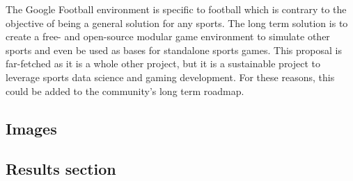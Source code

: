 \documentclass[
    11pt,
    oneside
]{report}
\begin{document}
The Google Football environment \cite{gfootball_env} is specific to football which is contrary to the objective of being a general solution for any sports. The long term solution is to create a free- and open-source modular game environment to simulate other sports and even be used as bases for standalone sports games. This proposal is far-fetched as it is a whole other project, but it is a sustainable project to leverage sports data science and gaming development. For these reasons, this could be added to the community's long term roadmap.



\printbibliography



\appendix
\renewcommand{\thesection}{\Alph{section}.\arabic{section}}
\setcounter{section}{0}
\begin{appendices}


\section{Images}


\subsection{Results section}


\end{appendices}
\end{document}
